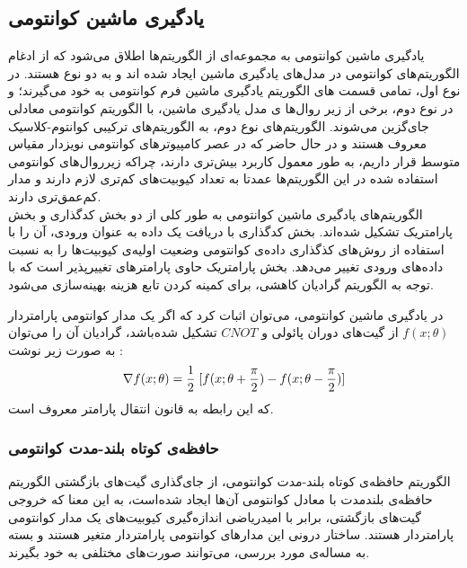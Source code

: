 \subsection{یادگیری ماشین کوانتومی}

یادگیری ماشین کوانتومی به مجموعه‌ای از الگوریتم‌ها اطلاق می‌شود که از ادغام الگوریتم‌های کوانتومی در مدل‌های یادگیری ماشین ایجاد شده ‌اند و به دو نوع هستند. در نوع اول، تمامی  قسمت ‌های الگوریتم یادگیری ماشین فرم کوانتومی به خود می‌گیرند؛ و در نوع دوم، برخی از زیر روال‌ها
ی مدل یادگیری ماشین، با الگوریتم کوانتومی معادلی جای‌گزین می‌شوند. الگوریتم‌های نوع دوم، به الگوریتم‌های ترکیبی کوانتوم-کلاسیک معروف هستند و در حال حاضر که در عصر
کامپیوترهای کوانتومی نویزدار مقیاس متوسط
قرار داریم، به طور معمول کاربرد بیش‌تری دارند، چراکه زیرروال‌های کوانتومی استفاده شده در این الگوریتم‌ها عمدتا به تعداد کیوبیت‌های کم‌تری لازم دارند و مدار کم‌عمق‌تری دارند. \\

الگوریتم‌های یادگیری ماشین کوانتومی به طور کلی از دو بخش کدگذاری
و بخش پارامتریک
تشکیل شده‌اند.
بخش کدگذاری با دریافت یک داده به عنوان ورودی، آن‌ را با استفاده از روش‌های کذگذاری داده‌ی کوانتومی
وضعیت اولیه‌ی کیوبیت‌ها را به نسبت داده‌های ورودی تغییر می‌دهد.
بخش پارامتریک حاوی پارامترهای تغییرپذیر است که با توجه به الگوریتم گرادیان کاهشی، برای کمینه کردن تابع هزینه بهینه‌سازی می‌شود.

در یادگیری ماشین کوانتومی، می‌توان اثبات کرد که اگر یک مدار کوانتومی پارامتردار
$f(x; \theta)$
از گیت‌های دوران پائولی و 
$CNOT$
تشکیل شده‌باشد، گرادیان آن را می‌توان به صورت زیر نوشت
\cite{Mitarai}:
\begin{equation}
    \nabla f(x; \theta) 
    = \frac{1}{2} \hspace{1mm} [f(x;\theta + \frac{\pi}{2}) - f(x; \theta - \frac{\pi}{2})]
\end{equation}
که این رابطه به قانون انتقال پارامتر
معروف است.

\subsubsection{حافظه‌ی کوتاه بلند-مدت کوانتومی} \label{sec:qlstm}
الگوریتم حافظه‌ی کوتاه بلند-مدت کوانتومی، از جای‌گذاری گیت‌های بازگشتی الگوریتم حافظه‌ی بلندمدت با  معادل کوانتومی آن‌ها ایجاد شده‌است، به این معنا که خروجی گیت‌های بازگشتی، برابر با امیدریاضی اندازه‌گیری کیوبیت‌های یک مدار کوانتومی پارامتردار هستند. 
ساختار درونی این مدارهای کوانتومی پارامتردار متغیر هستند و بسته به مساله‌ی مورد بررسی، می‌توانند صورت‌های مختلفی به خود بگیرند.

